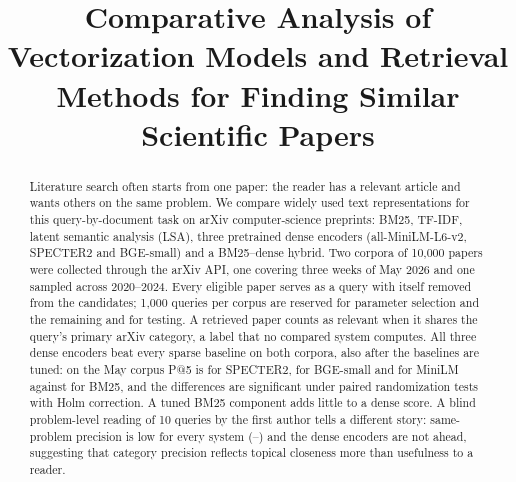 \documentclass[conference]{IEEEtran}
\begin{document}
\title{Comparative Analysis of Vectorization Models and Retrieval Methods for Finding Similar Scientific Papers}

\author{
\and
{}
}

\maketitle

\begin{abstract}
Literature search often starts from one paper: the reader has a relevant article and wants others on the same problem. We compare widely used text representations for this query-by-document task on arXiv computer-science preprints: BM25, TF-IDF, latent semantic analysis (LSA), three pretrained dense encoders (all-MiniLM-L6-v2, SPECTER2 and BGE-small) and a BM25--dense hybrid. Two corpora of 10{,}000 papers were collected through the arXiv API, one covering three weeks of May 2026 and one sampled across 2020--2024. Every eligible paper serves as a query with itself removed from the candidates; 1{,}000 queries per corpus are reserved for parameter selection and the remaining  and  for testing. A retrieved paper counts as relevant when it shares the query's primary arXiv category, a label that no compared system computes. All three dense encoders beat every sparse baseline on both corpora, also after the baselines are tuned: on the May corpus P@5 is  for SPECTER2,  for BGE-small and  for MiniLM against  for BM25, and the differences are significant under paired randomization tests with Holm correction. A tuned BM25 component adds little to a dense score. A blind problem-level reading of 10 queries by the first author tells a different story: same-problem precision is low for every system (--) and the dense encoders are not ahead, suggesting that category precision reflects topical closeness more than usefulness to a reader.
\end{abstract}
\end{document}
